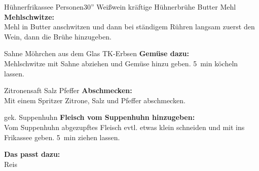 \begin{MyRecipe}{Hühnerfrikassee}{ Personen}{30''}
\ingredient[\Calc{0.1}{\x}]{\si{\liter}} {Weißwein}
\ingredient[\Calc{0.3}{\x}]{\si{\liter}} {kräftige Hühnerbrühe}
\ingredient[\Calc{25}{\x}]{\si{\gram}} {Butter}
\ingredient[\Calc{25}{\x}]{\si{\gram}} {Mehl}
\textbf{Mehlschwitze:}\\
Mehl in Butter anschwitzen und dann bei ständigem Rühren langsam zuerst den Wein, dann die Brühe hinzugeben.

\ingredient[\Calc{0.1}{\x}]{\si{\milli\liter}} {Sahne}
\ingredient[\Calc{0.15}{\x}]{\si{\gram}} {Möhrchen aus dem Glas}
\ingredient[\Calc{0.15}{\x}]{\si{\gram}} {TK-Erbsen}
\textbf{Gemüse dazu:}\\
Mehlschwitze mit Sahne abziehen und Gemüse hinzu geben. \SI{5}{\minute} köcheln lassen.

 {Zitronensaft}
\ingredient[]{} {Salz}
\ingredient[]{} {Pfeffer}
\textbf{Abschmecken:}\\
Mit einem Spritzer Zitrone, Salz und Pfeffer abschmecken.

\ingredient[]{} {gek. Suppenhuhn}
\textbf{Fleisch vom Suppenhuhn hinzugeben:}\\
Vom Suppenhuhn abgezupftes Fleisch evtl. etwas klein schneiden und mit ins Frikassee geben. \SI{5}{\minute} ziehen lassen.

\textbf{Das passt dazu:}\\
Reis

\end{MyRecipe}